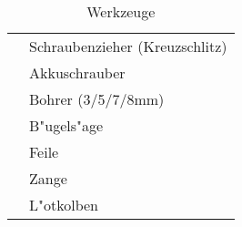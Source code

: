 
\vspace{1cm}
\begin{table}[ht]
	\centering

	\begin{tabular}{ c p{8cm} } 
		\hline \hline
			& Schraubenzieher (Kreuzschlitz) \\
			& Akkuschrauber                  \\
			& Bohrer (3/5/7/8mm)             \\
			& B"ugels"age                    \\
			& Feile                          \\
			& Zange                          \\
			& L"otkolben                     \\
		\hline \hline
	\end{tabular}

	\caption{Werkzeuge}
	\label{table:tools}
\end{table}
\vspace{0.5cm}
